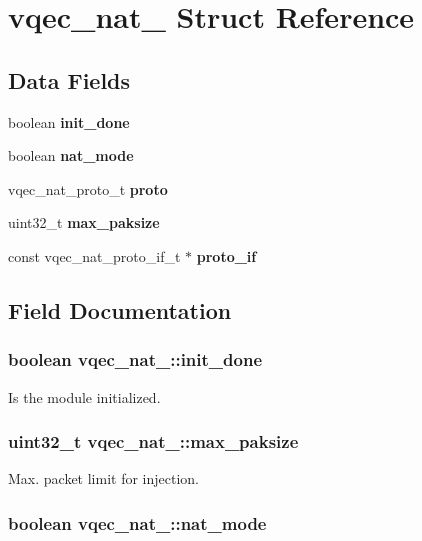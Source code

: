 \section{vqec\_\-nat\_\- Struct Reference}
\label{structvqec__nat__}
\subsection*{Data Fields}
\begin{CompactItemize}
\item 
boolean \bf{init\_\-done}
\item 
boolean \bf{nat\_\-mode}
\item 
vqec\_\-nat\_\-proto\_\-t \bf{proto}
\item 
uint32\_\-t \bf{max\_\-paksize}
\item 
const vqec\_\-nat\_\-proto\_\-if\_\-t $\ast$ \bf{proto\_\-if}
\end{CompactItemize}


\subsection{Field Documentation}
\subsubsection{\setlength{\rightskip}{0pt plus 5cm}boolean \bf{vqec\_\-nat\_\-::init\_\-done}}\label{structvqec__nat___b6517996e995408b6ade3697a981462f}


Is the module initialized. 
\subsubsection{\setlength{\rightskip}{0pt plus 5cm}uint32\_\-t \bf{vqec\_\-nat\_\-::max\_\-paksize}}\label{structvqec__nat___8988afaa48a569993cea124fe6b798ca}


Max. packet limit for injection. 
\subsubsection{\setlength{\rightskip}{0pt plus 5cm}boolean \bf{vqec\_\-nat\_\-::nat\_\-mode}}\label{structvqec__nat___de13b3ffe2769199631812d0603c90a7}


